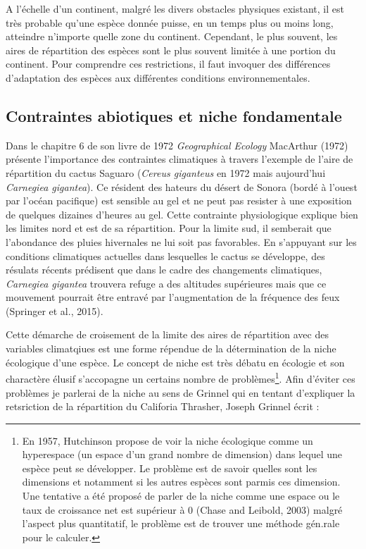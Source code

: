 A l'échelle d'un continent, malgré les divers obstacles physiques
existant, il est très probable qu'une espèce donnée puisse, en un temps
plus ou moins long, atteindre n'importe quelle zone du continent.
Cependant, le plus souvent, les aires de répartition des espèces sont le
plus souvent limitée à une portion du continent. Pour comprendre ces
restrictions, il faut invoquer des différences d'adaptation des espèces
aux différentes conditions environnementales.

\subsection*{Contraintes abiotiques et niche
fondamentale}\label{contraintes-abiotiques-et-niche-fondamentale}

Dans le chapitre 6 de son livre de 1972 \emph{Geographical Ecology}
MacArthur (1972) présente l'importance des contraintes climatiques à
travers l'exemple de l'aire de répartition du cactus Saguaro
(\emph{Cereus giganteus} en 1972 mais aujourd'hui \emph{Carnegiea
gigantea}). Ce résident des hateurs du désert de Sonora (bordé à l'ouest
par l'océan pacifique) est sensible au gel et ne peut pas resister à une
exposition de quelques dizaines d'heures au gel. Cette contrainte
physiologique explique bien les limites nord et est de sa répartition.
Pour la limite sud, il semberait que l'abondance des pluies hivernales
ne lui soit pas favorables. En s'appuyant sur les conditions climatiques
actuelles dans lesquelles le cactus se développe, des résulats récents
prédisent que dans le cadre des changements climatiques, \emph{Carnegiea
gigantea} trouvera refuge a des altitudes supérieures mais que ce
mouvement pourrait être entravé par l'augmentation de la fréquence des
feux (Springer et al., 2015).

Cette démarche de croisement de la limite des aires de répartition avec
des variables climatqiues est une forme répendue de la détermination de
la niche écologique d'une espèce. Le concept de niche est très débatu en
écologie et son charactère élusif s'accopagne un certains nombre de
problèmes\footnote{En 1957, Hutchinson propose de voir la niche
  écologique comme un hyperespace (un espace d'un grand nombre de
  dimension) dans lequel une espèce peut se développer. Le problème est
  de savoir quelles sont les dimensions et notamment si les autres
  espèces sont parmis ces dimension. Une tentative a été proposé de
  parler de la niche comme une espace ou le taux de croissance net est
  supérieur à 0 (Chase and Leibold, 2003) malgré l'aspect plus
  quantitatif, le problème est de trouver une méthode gén.rale pour le
  calculer.}. Afin d'éviter ces problèmes je parlerai de la niche au
sens de Grinnel qui en tentant d'expliquer la retsriction de la
répartition du Califoria Thrasher, Joseph Grinnel écrit :

